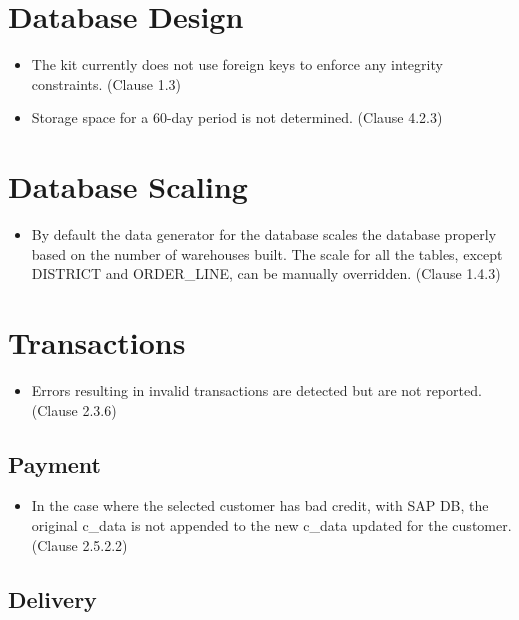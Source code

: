 \documentclass{article}
\begin{document}
\section{Database Design}

\begin{itemize}
\item The kit currently does not use foreign keys to enforce any integrity
      constraints.  (Clause 1.3)
\item Storage space for a 60-day period is not determined.  (Clause 4.2.3)
\end{itemize}

\section{Database Scaling}

\begin{itemize}
\item By default the data generator for the database scales the database
      properly based on the number of warehouses built.  The scale for all
      the tables, except DISTRICT and ORDER\_LINE, can be manually overridden.
      (Clause 1.4.3)
\end{itemize}

\section{Transactions}

\begin{itemize}
\item Errors resulting in invalid transactions are detected but are not
      reported.  (Clause 2.3.6)
\end{itemize}

\subsection{Payment}

\begin{itemize}
\item In the case where the selected customer has bad credit, with SAP DB,
      the original c\_data is not appended to the new c\_data updated for the
      customer.  (Clause 2.5.2.2)
\end{itemize}

\subsection{Delivery}
\end{document}

